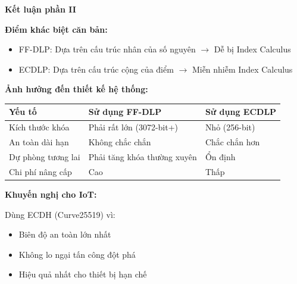 \textbf{Kết luận phần II}

\textbf{Điểm khác biệt căn bản:}
\begin{itemize}
    \item FF-DLP: Dựa trên cấu trúc nhân của số nguyên $\rightarrow$ Dễ bị Index Calculus
    \item ECDLP: Dựa trên cấu trúc cộng của điểm $\rightarrow$ Miễn nhiễm Index Calculus
\end{itemize}

\textbf{Ảnh hưởng đến thiết kế hệ thống:}

\begin{center}
\begin{tabular}{|p{3.5cm}|p{4cm}|p{4cm}|}
\hline
\textbf{Yếu tố} & \textbf{Sử dụng FF-DLP} & \textbf{Sử dụng ECDLP} \\
\hline
Kích thước khóa & Phải rất lớn (3072-bit+) & Nhỏ (256-bit) \\
An toàn dài hạn & Không chắc chắn & Chắc chắn hơn \\
Dự phòng tương lai & Phải tăng khóa thường xuyên & Ổn định \\
Chi phí nâng cấp & Cao & Thấp \\
\hline
\end{tabular}
\end{center}

\textbf{Khuyến nghị cho IoT:}

Dùng ECDH (Curve25519) vì:
\begin{itemize}
    \item Biên độ an toàn lớn nhất
    \item Không lo ngại tấn công đột phá
    \item Hiệu quả nhất cho thiết bị hạn chế
\end{itemize}
